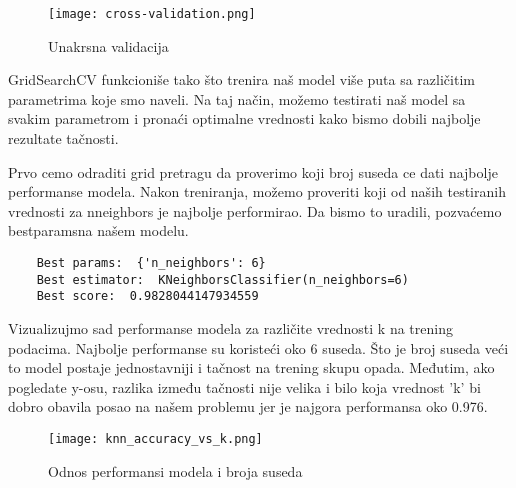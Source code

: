 \documentclass[a4paper,12pt]{article}
\begin{document}
\begin{figure}[h!]
\centering
\texttt{[image: cross-validation.png]}
\caption{Unakrsna validacija}
\label{fig:cross_validation}
\end{figure}


GridSearchCV funkcioniše tako što trenira naš model više puta sa različitim parametrima koje smo naveli. Na taj način, možemo testirati naš model sa svakim parametrom i pronaći optimalne vrednosti kako bismo dobili najbolje rezultate tačnosti.

Prvo cemo odraditi grid pretragu da proverimo koji broj suseda ce dati najbolje performanse modela.
Nakon treniranja, možemo proveriti koji od naših testiranih vrednosti za n\textunderscore neighbors je najbolje performirao. Da bismo to uradili, pozvaćemo best\textunderscore params\textunderscore  na našem modelu.

\begin{verbatim}
    Best params:  {'n_neighbors': 6}
    Best estimator:  KNeighborsClassifier(n_neighbors=6)
    Best score:  0.9828044147934559
\end{verbatim}

Vizualizujmo sad performanse modela za različite vrednosti k na trening podacima. Najbolje performanse su koristeći oko 6 suseda. Što je broj suseda veći to model postaje jednostavniji i tačnost na trening skupu opada. Međutim, ako pogledate y-osu, razlika između tačnosti nije velika i bilo koja vrednost 'k' bi dobro obavila posao na našem problemu jer je najgora performansa oko 0.976.

\begin{figure}[h!]
\centering
\texttt{[image: knn\_accuracy\_vs\_k.png]}
\caption{Odnos performansi modela i broja suseda}
\label{fig:knn_accuracy_vs_k}
\end{figure}
\end{document}
